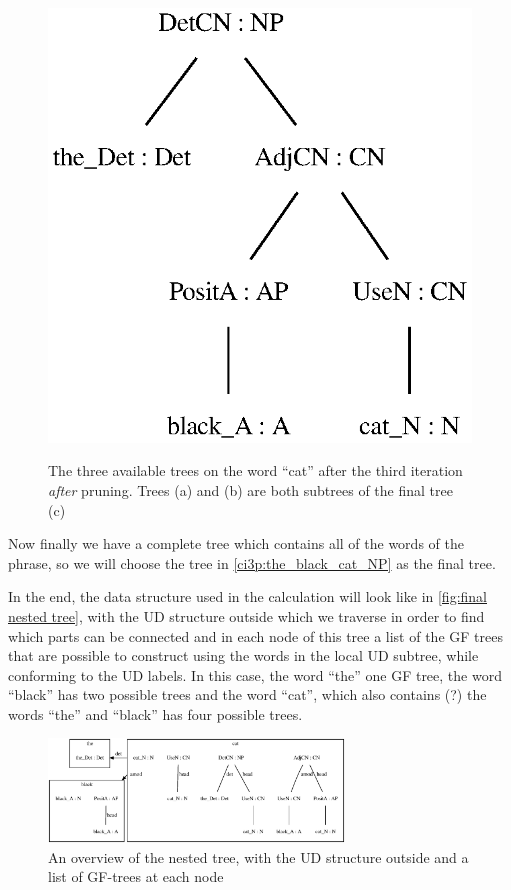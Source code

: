 \begin{figure}
        {\includegraphics[scale=0.75]{thesis/figure/black_cats/the_black_cat_NP_gf.eps}}
    \caption{The three available trees on the word ``cat'' after the third iteration \emph{after} pruning. Trees (a) and (b) are both subtrees of the final tree (c)}\label{fig:cat iter 3 pruned}
\end{figure}

Now finally we have a complete tree which contains all of the words of the phrase, so we will choose the tree in \autoref{ci3p:the_black_cat_NP} as the final tree. 

In the end, the data structure used in the calculation will look like in \autoref{fig:final nested tree}, with the UD structure outside which we traverse in order to find which parts can be connected and in each node of this tree a list of the GF trees that are possible to construct using the words in the local UD subtree, while conforming to the UD labels. In this case, the word ``the'' one GF tree, the word ``black'' has two possible trees and the word ``cat'', which also contains (?) the words ``the'' and ``black'' has four possible trees. 

\begin{figure}
    \centering
    \includegraphics[width=0.7\textwidth]{figure/black_cats/the_black_cat_graph}
    \caption{An overview of the nested tree, with the UD structure outside and a list of GF-trees at each node}\label{fig:final nested tree}
\end{figure}


